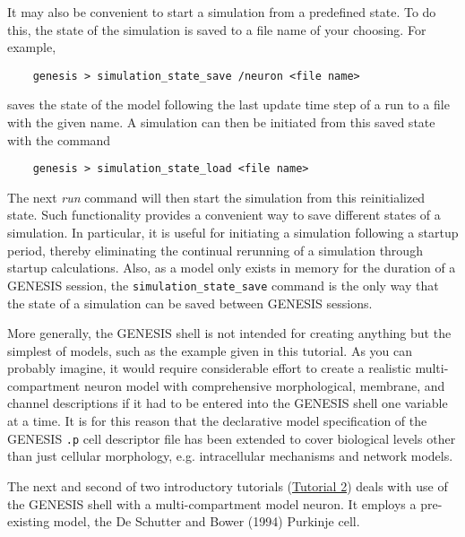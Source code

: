 \documentclass[12pt]{article}
\begin{document}
It may also be convenient to start a simulation from a predefined state. To do this, the state of the simulation is saved to a file name of your choosing. For example,
\begin{verbatim}
    genesis > simulation_state_save /neuron <file name>
\end{verbatim}
saves the state of the model following the last update time step of a run to a file with the given name. A simulation can then be initiated from this saved state with the command 
\begin{verbatim}
    genesis > simulation_state_load <file name>
\end{verbatim}
The next {\it run} command will then start the simulation from this reinitialized state. Such functionality provides a convenient way to save different states of a simulation. In particular, it is useful for initiating a simulation following a startup period, thereby eliminating the continual rerunning of a simulation through startup calculations. Also, as a model only exists in memory for the duration of a GENESIS session, the {\tt simulation\_state\_save} command  is the only way that the state of a simulation can be saved between GENESIS sessions.

More generally, the GENESIS shell is not intended for creating anything but the simplest of models, such as the example given in this tutorial.  As you can probably imagine, it would require considerable effort to create a realistic multi-compartment neuron model with comprehensive morphological, membrane, and channel descriptions if it had to be entered into the GENESIS shell one variable at a time. It is for this reason that the declarative model specification of the GENESIS {\tt.p} cell descriptor file has been extended to cover biological levels other than just cellular morphology, e.g. intracellular mechanisms and network models.

The next and second of two introductory tutorials (\href{../tutorial2/tutorial2.pdf}{Tutorial 2}) deals with use of the GENESIS shell with a multi-compartment model neuron. It employs a pre-existing model, the De Schutter and Bower (1994) Purkinje cell.

\end{document}
